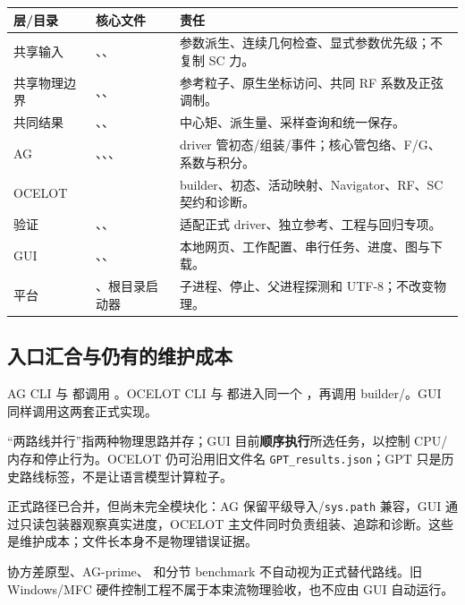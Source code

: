 \begin{longtable}{P{25mm}P{58mm}P{67mm}}
\toprule 层/目录 & 核心文件 & 责任 \\ \midrule\endhead
共享输入 & 、、 & 参数派生、连续几何检查、显式参数优先级；不复制 SC 力。\\
共享物理边界 & 、、 & 参考粒子、原生坐标访问、共同 RF 系数及正弦调制。\\
共同结果 & 、、 & 中心矩、派生量、采样查询和统一保存。\\
AG & 、、、 & driver 管初态/组装/事件；核心管包络、F/G、系数与积分。\\
OCELOT &  & builder、初态、活动映射、Navigator、RF、SC 契约和诊断。\\
验证 & 、、 & 适配正式 driver、独立参考、工程与回归专项。\\
GUI & 、、 & 本地网页、工作配置、串行任务、进度、图与下载。\\
平台 & 、根目录启动器 & 子进程、停止、父进程探测和 UTF-8；不改变物理。\\
\bottomrule\end{longtable}

\subsection{入口汇合与仍有的维护成本}
AG CLI  与  都调用 。OCELOT CLI 与  都进入同一个 ，再调用 builder/。GUI 同样调用这两套正式实现。

“两路线并行”指两种物理思路并存；GUI 目前\textbf{顺序执行}所选任务，以控制 CPU/内存和停止行为。OCELOT 仍可沿用旧文件名 \texttt{GPT\_results.json}；GPT 只是历史路线标签，不是让语言模型计算粒子。

正式路径已合并，但尚未完全模块化：AG 保留平级导入/\texttt{sys.path} 兼容，GUI 通过只读包装器观察真实进度，OCELOT 主文件同时负责组装、追踪和诊断。这些是维护成本；文件长本身不是物理错误证据。

协方差原型、AG-prime、 和分节 benchmark 不自动视为正式替代路线。旧 Windows/MFC 硬件控制工程不属于本束流物理验收，也不应由 GUI 自动运行。

